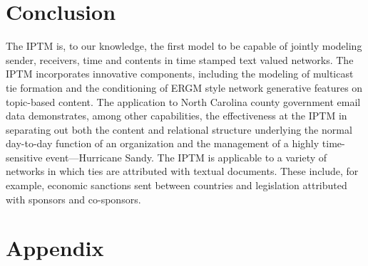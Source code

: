 \documentclass[a4paper]{article}
\begin{document}
\section{Conclusion} 
The IPTM is, to our knowledge, the first model to be capable of jointly modeling sender, receivers, time and contents in time stamped text valued networks. The IPTM incorporates innovative components, including the modeling of multicast tie formation and the conditioning of ERGM style network generative features on topic-based content. The application to North Carolina county government email data demonstrates, among other capabilities, the effectiveness at the IPTM in separating out both the content and relational structure underlying the normal day-to-day function of an organization and the management of a highly time-sensitive event---Hurricane Sandy. The IPTM is applicable to a variety of networks in which ties are attributed with textual documents. These include, for example, economic sanctions sent between countries and legislation attributed with sponsors and co-sponsors. 
 \clearpage


\newpage
\appendix
 \section*{Appendix}
 \renewcommand{\thesubsection}{\Alph{subsection}}
\end{document}

